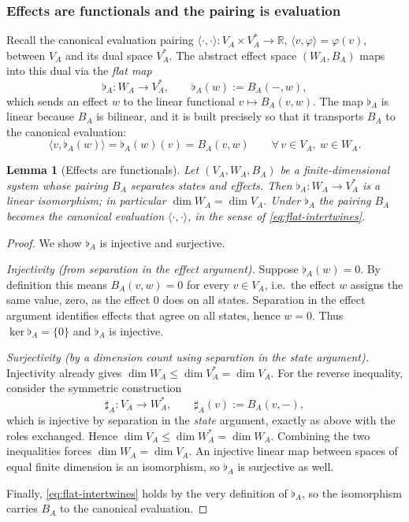 \documentclass[prl,aps,10pt,superscriptaddress, floatfix]{revtex4-2}
\newtheorem{lemma}{Lemma}
\begin{document}
\subsubsection*{Effects are functionals and the pairing is evaluation}

Recall the canonical evaluation pairing $\langle\cdot,\cdot\rangle:V_A\times V_A^*\to\mathbb{R}$, $\langle v,\varphi\rangle=\varphi(v)$, between $V_A$ and its dual space $V_A^*$. The abstract effect space $(W_A,B_A)$ maps into this dual via the \emph{flat map}
\[
\flat_A:W_A\longrightarrow V_A^*,\qquad \flat_A(w):=B_A(-,w),
\]
which sends an effect $w$ to the linear functional $v\mapsto B_A(v,w)$. The map $\flat_A$ is linear because $B_A$ is bilinear, and it is built precisely so that it transports $B_A$ to the canonical evaluation:
\begin{equation}\label{eq:flat-intertwines}
\langle v,\flat_A(w)\rangle=\flat_A(w)(v)=B_A(v,w)\qquad\forall\, v\in V_A,\ w\in W_A.
\end{equation}

\begin{lemma}[Effects are functionals]\label{lem:flat}
Let $(V_A,W_A,B_A)$ be a finite-dimensional system whose pairing $B_A$ separates states and effects. Then $\flat_A:W_A\to V_A^*$ is a linear isomorphism; in particular $\dim W_A=\dim V_A$. Under $\flat_A$ the pairing $B_A$ becomes the canonical evaluation $\langle\cdot,\cdot\rangle$, in the sense of \eqref{eq:flat-intertwines}.
\end{lemma}

\begin{proof}
We show $\flat_A$ is injective and surjective.

\emph{Injectivity (from separation in the effect argument).} Suppose $\flat_A(w)=0$. By definition this means $B_A(v,w)=0$ for every $v\in V_A$, i.e.\ the effect $w$ assigns the same value, zero, as the effect $0$ does on all states. Separation in the effect argument identifies effects that agree on all states, hence $w=0$. Thus $\ker\flat_A=\{0\}$ and $\flat_A$ is injective.

\emph{Surjectivity (by a dimension count using separation in the state argument).} Injectivity already gives $\dim W_A\le\dim V_A^*=\dim V_A$. For the reverse inequality, consider the symmetric construction
\[
\sharp_A:V_A\longrightarrow W_A^*,\qquad \sharp_A(v):=B_A(v,-),
\]
which is injective by separation in the \emph{state} argument, exactly as above with the roles exchanged. Hence $\dim V_A\le\dim W_A^*=\dim W_A$. Combining the two inequalities forces $\dim W_A=\dim V_A$. An injective linear map between spaces of equal finite dimension is an isomorphism, so $\flat_A$ is surjective as well.

Finally, \eqref{eq:flat-intertwines} holds by the very definition of $\flat_A$, so the isomorphism carries $B_A$ to the canonical evaluation.
\end{proof}
\end{document}
